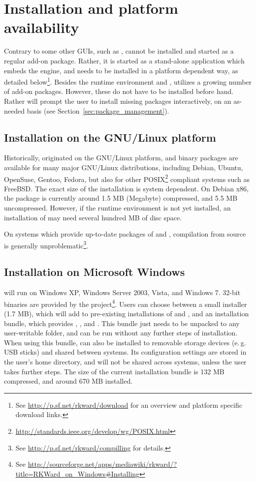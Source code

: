 \section{Installation and platform availability}
\label{sec:installing_starting_RKWard}
Contrary to some other  GUIs, such as ,  cannot be installed and started as a
regular  add-on package. Rather, it is started as a stand-alone application which embeds the
 engine, and needs to be installed in a platform dependent way, as detailed below\footnote{
  See \url{http://p.sf.net/rkward/download} for an overview and platform specific download links.
}. Besides the
 runtime environment and ,  utilizes a growing number of  add-on packages.
However, these do not have to be installed before hand. Rather  will prompt the user to install
missing packages interactively, on an as-needed basis (see Section~\ref{sec:package_management}).

\subsection{Installation on the GNU/Linux platform}
Historically,  originated on the GNU/Linux platform, and binary packages are available for many
major GNU/Linux distributions, including Debian, Ubuntu, OpenSuse, Gentoo, Fedora, but also for other POSIX\footnote{
\url{http://standards.ieee.org/develop/wg/POSIX.html}
}
compliant systems such as FreeBSD.  The exact size of the installation is system dependent. On Debian x86, the
package is currently around 1.5 MB (Megabyte) compressed, and 5.5 MB uncompressed. However, if the 
runtime environment is not yet installed, an installation of  may need several hundred MB of disc
space.

On systems which provide up-to-date packages of  and , compilation from source is
generally unproblematic\footnote{
  See \url{http://p.sf.net/rkward/compilling} for details.
}.

\subsection{Installation on Microsoft Windows}
 will run on Windows XP, Windows Server 2003, Vista, and Windows 7. 32-bit binaries are
provided by the project\footnote{
  See \url{http://sourceforge.net/apps/mediawiki/rkward/?title=RKWard\_on\_Windows\#Installing}
}. Users can
choose between a small installer (1.7 MB), which will add  to pre-existing installations of
 and , and an installation bundle, which provides , , and
. This bundle just needs to be unpacked to any user-writable folder, and can be run without any
further steps of installation. When using this bundle,  can also be installed to removable storage
devices (e.\,g. USB sticks) and shared between systems. Its configuration settings are stored in the user's
home directory, and will not be shared across systems, unless the user takes further steps. The size of the
current installation bundle is 132 MB compressed, and around 670 MB installed.

